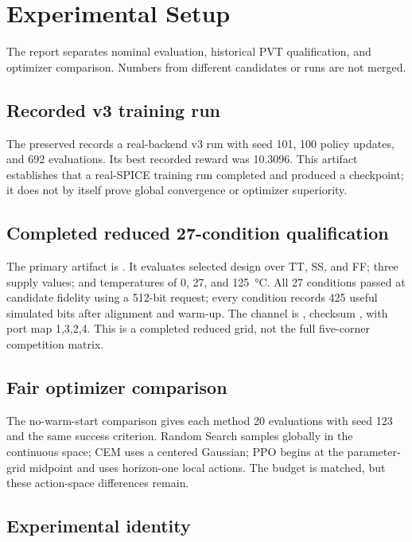 \chapter{Experimental Setup}

The report separates nominal evaluation, historical PVT qualification, and
optimizer comparison. Numbers from different candidates or runs are not merged.

\section{Recorded v3 training run}

The preserved  records a real-backend
v3 run with seed 101, 100 policy updates, and 692 evaluations. Its best recorded
reward was 10.3096. This artifact establishes that a real-SPICE training run
completed and produced a checkpoint; it does not by itself prove global
convergence or optimizer superiority.

\section{Completed reduced 27-condition qualification}

The primary artifact is
.
It evaluates selected design  over TT, SS, and FF; three
supply values; and temperatures of 0, 27, and \SI{125}{\degreeCelsius}. All 27
conditions passed at candidate fidelity using a 512-bit request; every condition
records 425 useful simulated bits after alignment and warm-up. The channel is
, checksum
, with port map 1,3,2,4. This is a completed reduced
grid, not the full five-corner competition matrix.

\section{Fair optimizer comparison}

The no-warm-start comparison gives each method 20 evaluations with seed 123 and
the same success criterion. Random Search samples globally in the continuous
space; CEM uses a centered Gaussian; PPO begins at the parameter-grid midpoint
and uses horizon-one local actions. The budget is matched, but these action-space
differences remain.

\section{Experimental identity}


